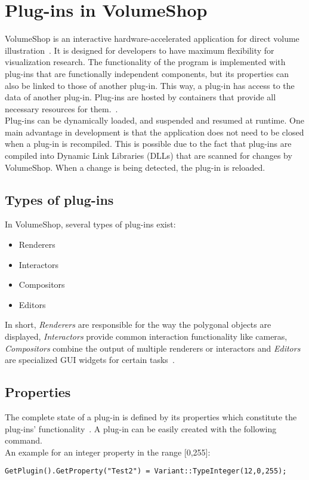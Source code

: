 
\section{Plug-ins in VolumeShop}
VolumeShop is an interactive hardware-accelerated application for direct volume illustration~\cite{proc:volumeshop}. It is designed for developers to have maximum flexibility for visualization research. The functionality of the program is implemented with plug-ins that are functionally independent components, but its properties can also be linked to those of another plug-in. This way, a plug-in has access to the data of another plug-in. Plug-ins are hosted by containers that provide all necessary resources for them.~\cite{misc:volumeshop101}.\\
\newline
Plug-ins can be dynamically loaded, and suspended and resumed at runtime. One main advantage in development is that the application does not need to be closed when a plug-in is recompiled. This is possible due to the fact that plug-ins are compiled into Dynamic Link Libraries (DLLs) that are scanned for changes by VolumeShop. When a change is being detected, the plug-in is reloaded.

\subsection{Types of plug-ins}
In VolumeShop, several types of plug-ins exist:
\begin{itemize}
	\item Renderers
	\item Interactors
	\item Compositors
	\item Editors
\end{itemize}

In short, \emph{Renderers} are responsible for the way the polygonal objects are displayed, \emph{Interactors} provide common interaction functionality like cameras, \emph{Compositors} combine the output of multiple renderers or interactors and \emph{Editors} are specialized GUI widgets for certain tasks~\cite{misc:volumeshop101}.

\subsection{Properties}
The complete state of a plug-in is defined by its properties which constitute the plug-ins' functionality~\cite{misc:volumeshop101}. A plug-in can be easily created with the following command. \\
An example for an integer property in the range [0,255]:
\begin{lstlisting}
GetPlugin().GetProperty("Test2") = Variant::TypeInteger(12,0,255);
\end{lstlisting}

